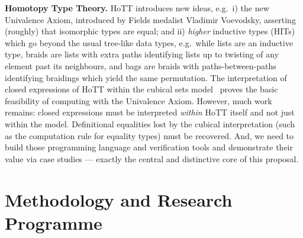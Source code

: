 \documentclass[a4paper,11pt]{article}
\newcommand{\eg}{{e.g.}\ }
\begin{document}
{\bf Homotopy Type Theory.} HoTT introduces new ideas, \eg i) the new Univalence
Axiom, introduced by Fields medalist Vladimir Voevodsky, asserting
(roughly) that isomorphic types are equal; and ii) \emph{higher} inductive types (HITs)
which go beyond the usual tree-like data types, \eg while lists are an
inductive type, braids are lists with extra paths identifying lists up
to twisting of any element past its neighbours, and bags are braids
with paths-between-paths identifying braidings which yield the same
permutation.  The interpretation of closed expressions of HoTT within
the cubical sets model~\cite{BezemM:cubsmt, nominal} proves the basic
feasibility of computing with the Univalence Axiom.  However, much
work remains: closed expressions must be interpreted \emph{within}
HoTT itself and not just within the model. Definitional equalities
lost by the cubical interpretation (such as the computation rule for
equality types) must be recovered. And, we need to build
those programming language and verification tools and demonstrate their value via case studies --- exactly
the central and distinctive core of this proposal.








\vspace*{-0.2in}

\section{Methodology and Research Programme}
\vspace*{-0.1in}
\end{document}
